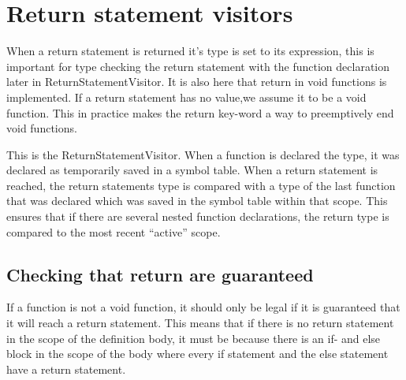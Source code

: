 \section{Return statement visitors}
When a return statement is returned it's type is set to its expression, this is important for type checking the return statement with the function declaration later in ReturnStatementVisitor.
It is also here that return in void functions is implemented. If a return statement has no value,we assume it to be a void function. This in practice makes the return key-word a way to preemptively end void functions.

\noindent\newline

This is the ReturnStatementVisitor. When a function is declared the type, it was declared as temporarily saved in a symbol table. When a return statement is reached, the return statements type is compared with a type of the last function that was declared which was saved in the symbol table within that scope. This ensures that if there are several nested function declarations, the return type is compared to the most recent “active” scope.

\noindent\newline


\noindent\newline

\subsection{Checking that return are guaranteed}
If a function is not a void function, it should only be legal if it is guaranteed that it will reach a return statement. This means that if there is no return statement in the scope of the definition body, it must be because there is an if- and else block in the scope of the body where every if statement and the else statement have a return statement.

\noindent\newline


\noindent\newline


\noindent\newline